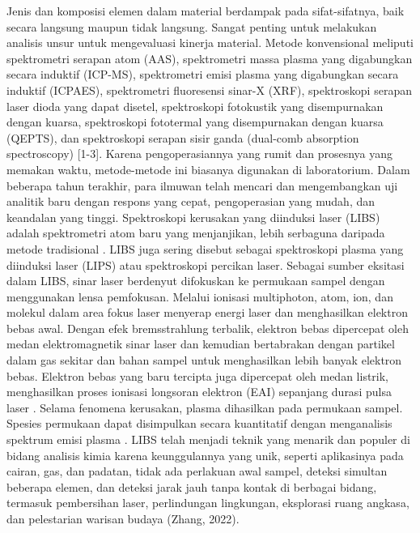 \par Jenis dan komposisi elemen dalam material berdampak pada sifat-sifatnya, baik secara langsung maupun tidak langsung. Sangat penting untuk melakukan analisis unsur untuk mengevaluasi kinerja material. Metode konvensional meliputi spektrometri serapan atom (AAS), spektrometri massa plasma yang digabungkan secara induktif (ICP-MS), spektrometri emisi plasma yang digabungkan secara induktif (ICPAES), spektrometri fluoresensi sinar-X (XRF), spektroskopi serapan laser dioda yang dapat disetel, spektroskopi fotokustik yang disempurnakan dengan kuarsa, spektroskopi fototermal yang disempurnakan dengan kuarsa (QEPTS), dan spektroskopi serapan sisir ganda (dual-comb absorption spectroscopy) [1-3]. Karena pengoperasiannya yang rumit dan prosesnya yang memakan waktu, metode-metode ini biasanya digunakan di laboratorium. Dalam beberapa tahun terakhir, para ilmuwan telah mencari dan mengembangkan uji analitik baru dengan respons yang cepat, pengoperasian yang mudah, dan keandalan yang tinggi. Spektroskopi kerusakan yang diinduksi laser (LIBS) adalah spektrometri atom baru yang menjanjikan, lebih serbaguna daripada metode tradisional . LIBS juga sering disebut sebagai spektroskopi plasma yang diinduksi laser (LIPS) atau spektroskopi percikan laser. Sebagai sumber eksitasi dalam LIBS, sinar laser berdenyut difokuskan ke permukaan sampel dengan menggunakan lensa pemfokusan. Melalui ionisasi multiphoton, atom, ion, dan molekul dalam area fokus laser menyerap energi laser dan menghasilkan elektron bebas awal. Dengan efek bremsstrahlung terbalik, elektron bebas dipercepat oleh medan elektromagnetik sinar laser dan kemudian bertabrakan dengan partikel dalam gas sekitar dan bahan sampel untuk menghasilkan lebih banyak elektron bebas. Elektron bebas yang baru tercipta juga dipercepat oleh medan listrik, menghasilkan proses ionisasi longsoran elektron (EAI) sepanjang durasi pulsa laser . Selama fenomena kerusakan, plasma dihasilkan pada permukaan sampel. Spesies permukaan dapat disimpulkan secara kuantitatif dengan menganalisis spektrum emisi plasma . LIBS telah menjadi teknik yang menarik dan populer di bidang analisis kimia karena keunggulannya yang unik, seperti aplikasinya pada cairan, gas, dan padatan, tidak ada perlakuan awal sampel, deteksi simultan beberapa elemen, dan deteksi jarak jauh tanpa kontak di berbagai bidang, termasuk pembersihan laser, perlindungan lingkungan, eksplorasi ruang angkasa, dan pelestarian warisan budaya (Zhang, 2022).


